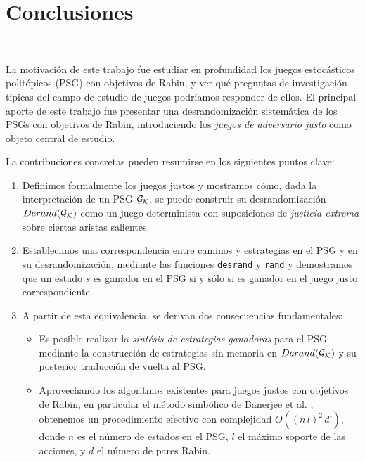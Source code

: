 \chapter{Conclusiones}
~\label{cap:conclusions}
\vspace{-1cm}

La motivación de este trabajo fue estudiar en profundidad los juegos
estocásticos politópicos (PSG) con objetivos de Rabin, y ver qué preguntas de
investigación típicas del campo de estudio de juegos podríamos responder de
ellos. El principal aporte de este trabajo fue presentar una desrandomización
sistemática de los PSGs con objetivos de Rabin, introduciendo los \emph{juegos
	de adversario justo} como objeto central de estudio.

La contribuciones concretas pueden resumirse en los siguientes puntos clave:

\begin{enumerate}
	\item Definimos formalmente los juegos justos y mostramos cómo, dada la
	      interpretación de un PSG $\mathcal{G}_{\mathcal{K}}$, se puede construir su desrandomización $Derand(\mathcal{G}_{\mathcal{K}})$
	      como un juego determinista con suposiciones de \emph{justicia extrema} sobre
	      ciertas aristas salientes.
	\item Establecimos una correspondencia entre caminos y estrategias en el PSG y en su
	      desrandomización, mediante las funciones \texttt{desrand} y \texttt{rand} y
	      demostramos que un estado $s$ es ganador en el PSG si y sólo si es ganador en
	      el juego justo correspondiente.
	\item A partir de esta equivalencia, se derivan dos consecuencias fundamentales:
	      \begin{itemize}
		      \item Es posible realizar la \emph{sintésis de estrategias ganadoras} para el PSG
		            mediante la construcción de estrategias sin memoria en $Derand(\mathcal{G}_{\mathcal{K}})$ y su posterior
		            traducción de vuelta al PSG.
		      \item Aprovechando los algoritmos existentes para juegos justos con objetivos de
		            Rabin, en particular el método simbólico de Banerjee et al. \cite{Banerjee},
		            obtenemos un procedimiento efectivo con complejidad $O((n\,l)^2\,d!)$, donde
		            $n$ es el número de estados en el PSG, $l$ el máximo soporte de las acciones, y
		            $d$ el número de pares Rabin.
	      \end{itemize}
\end{enumerate}

